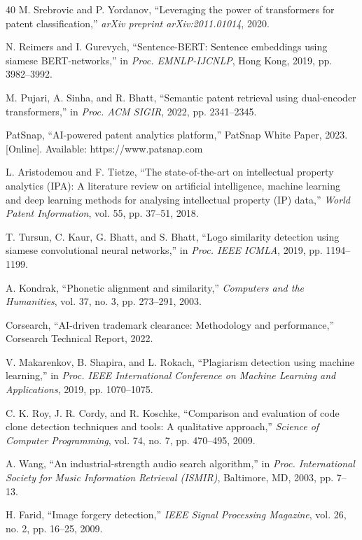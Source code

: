 \documentclass[conference]{IEEEtran}
\begin{document}
\begin{thebibliography}{40}
M. Srebrovic and P. Yordanov, ``Leveraging the power of transformers for patent classification,'' \textit{arXiv preprint arXiv:2011.01014}, 2020.

N. Reimers and I. Gurevych, ``Sentence-BERT: Sentence embeddings using siamese BERT-networks,'' in \textit{Proc. EMNLP-IJCNLP}, Hong Kong, 2019, pp. 3982--3992.

M. Pujari, A. Sinha, and R. Bhatt, ``Semantic patent retrieval using dual-encoder transformers,'' in \textit{Proc. ACM SIGIR}, 2022, pp. 2341--2345.

PatSnap, ``AI-powered patent analytics platform,'' PatSnap White Paper, 2023. [Online]. Available: https://www.patsnap.com

L. Aristodemou and F. Tietze, ``The state-of-the-art on intellectual property analytics (IPA): A literature review on artificial intelligence, machine learning and deep learning methods for analysing intellectual property (IP) data,'' \textit{World Patent Information}, vol. 55, pp. 37--51, 2018.

T. Tursun, C. Kaur, G. Bhatt, and S. Bhatt, ``Logo similarity detection using siamese convolutional neural networks,'' in \textit{Proc. IEEE ICMLA}, 2019, pp. 1194--1199.

A. Kondrak, ``Phonetic alignment and similarity,'' \textit{Computers and the Humanities}, vol. 37, no. 3, pp. 273--291, 2003.

Corsearch, ``AI-driven trademark clearance: Methodology and performance,'' Corsearch Technical Report, 2022.

V. Makarenkov, B. Shapira, and L. Rokach, ``Plagiarism detection using machine learning,'' in \textit{Proc. IEEE International Conference on Machine Learning and Applications}, 2019, pp. 1070--1075.

C. K. Roy, J. R. Cordy, and R. Koschke, ``Comparison and evaluation of code clone detection techniques and tools: A qualitative approach,'' \textit{Science of Computer Programming}, vol. 74, no. 7, pp. 470--495, 2009.

A. Wang, ``An industrial-strength audio search algorithm,'' in \textit{Proc. International Society for Music Information Retrieval (ISMIR)}, Baltimore, MD, 2003, pp. 7--13.

H. Farid, ``Image forgery detection,'' \textit{IEEE Signal Processing Magazine}, vol. 26, no. 2, pp. 16--25, 2009.


\end{thebibliography}
\end{document}
